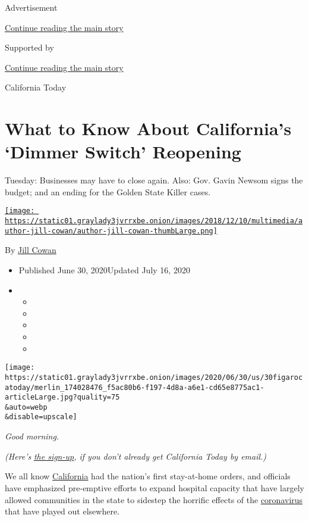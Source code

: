 Advertisement

\protect\hyperlink{after-top}{Continue reading the main story}

Supported by

\protect\hyperlink{after-sponsor}{Continue reading the main story}

California Today

\hypertarget{what-to-know-about-californias-dimmer-switch-reopening}{%
\section{What to Know About California's `Dimmer Switch'
Reopening}\label{what-to-know-about-californias-dimmer-switch-reopening}}

Tuesday: Businesses may have to close again. Also: Gov. Gavin Newsom
signs the budget; and an ending for the Golden State Killer cases.

\href{https://www.nytimes3xbfgragh.onion/by/jill-cowan}{\texttt{[image: https://static01.graylady3jvrrxbe.onion/images/2018/12/10/multimedia/author-jill-cowan/author-jill-cowan-thumbLarge.png]}}

By \href{https://www.nytimes3xbfgragh.onion/by/jill-cowan}{Jill Cowan}

\begin{itemize}
\item
  Published June 30, 2020Updated July 16, 2020
\item
  \begin{itemize}
  \item
  \item
  \item
  \item
  \item
  \end{itemize}
\end{itemize}

\texttt{[image: https://static01.graylady3jvrrxbe.onion/images/2020/06/30/us/30figarocatoday/merlin\_174028476\_f5ac80b6-f197-4d8a-a6e1-cd65e8775ac1-articleLarge.jpg?quality=75\\\&auto=webp\\\&disable=upscale]}

\emph{Good morning.}

\emph{(Here's}
\href{https://www.nytimes3xbfgragh.onion/newsletters/california-today}{\emph{the
sign-up}}\emph{, if you don't already get California Today by email.)}

We all know
\href{https://www.nytimes3xbfgragh.onion/2020/07/16/us/california-coronavirus-cases.html}{California}
had the nation's first stay-at-home orders, and officials have
emphasized pre-emptive efforts to expand hospital capacity that have
largely allowed communities in the state to sidestep the horrific
effects of the
\href{https://www.nytimes3xbfgragh.onion/2020/07/16/us/california-coronavirus-cases.html}{coronavirus}
that have played out elsewhere.

